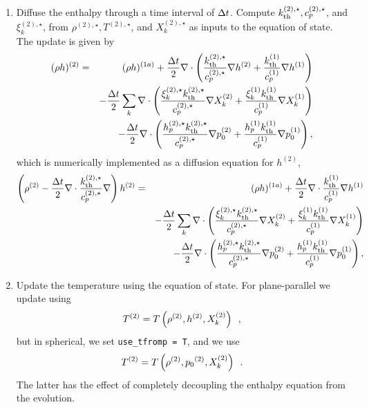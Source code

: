 \begin{description}
\begin{enumerate}
\item Diffuse the enthalpy through a time interval of $\Delta t$.  Compute $k_{\rm th}^{(2),\star}, c_p^{(2),\star}$, and $\xi_k^{(2),\star}$, from $\rho^{(2),\star}, T^{(2),\star}$, and $X_k^{(2),\star}$ as inputs to the equation of state.  The update is given by
\begin{eqnarray}
(\rho h)^{(2)} &=& (\rho h)^{(1a)} + \frac{\Delta t}{2}\nabla\cdot\left(\frac{k_{\rm th}^{(2),\star}}{c_p^{(2),\star}}\nabla h^{(2)} + \frac{k_{\rm th}^{(1)}}{c_p^{(1)}}\nabla h^{(1)}\right)\nonumber\\
&&- \frac{\Delta t}{2}\sum_k\nabla\cdot\left(\frac{\xi_k^{(2),\star}k_{\rm th}^{(2),\star}}{c_p^{(2),\star}}\nabla X_k^{(2)} + \frac{\xi_k^{(1)}k_{\rm th}^{(1)}}{c_p^{(1)}}\nabla X_k^{(1)}\right)\nonumber\\
&&- \frac{\Delta t}{2}\nabla\cdot\left(\frac{h_p^{(2),\star}k_{\rm th}^{(2),\star}}{c_p^{(2),\star}}\nabla p_0^{(2)} + \frac{h_p^{(1)}k_{\rm th}^{(1)}}{c_p^{(1)}}\nabla p_0^{(1)}\right),
\end{eqnarray}
which is numerically implemented as a diffusion equation for $h^{(2)}$,
\begin{eqnarray}
\left(\rho^{(2)} - \frac{\Delta t}{2}\nabla\cdot\frac{k_{\rm th}^{(2),\star}}{c_p^{(2),\star}}\nabla\right)h^{(2)} &=& (\rho h)^{(1a)} + \frac{\Delta t}{2}\nabla\cdot\frac{k_{\rm th}^{(1)}}{c_p^{(1)}}\nabla h^{(1)}\nonumber\\
&&- \frac{\Delta t}{2}\sum_k\nabla\cdot\left(\frac{\xi_k^{(2),\star}k_{\rm th}^{(2),\star}}{c_p^{(2),\star}}\nabla X_k^{(2)} + \frac{\xi_k^{(1)}k_{\rm th}^{(1)}}{c_p^{(1)}}\nabla X_k^{(1)}\right)\nonumber\\
&&- \frac{\Delta t}{2}\nabla\cdot\left(\frac{h_p^{(2),\star}k_{\rm th}^{(2),\star}}{c_p^{(2),\star}}\nabla p_0^{(2)} + \frac{h_p^{(1)}k_{\rm th}^{(1)}}{c_p^{(1)}}\nabla p_0^{(1)}\right),
\end{eqnarray}
\item Update the temperature using the equation of state.  For plane-parallel we
update using
\begin{equation}
T^{(2)} = T\left(\rho^{(2)}, h^{(2)}, X_k^{(2)}\right) \enskip ,
\end{equation}
but in spherical, we set {\tt use\_tfromp = T}, and we use
\begin{equation}
T^{(2)} = T\left(\rho^{(2)}, {p_0}^{(2)}, X_k^{(2)}\right) \enskip .
\end{equation}
The latter has the effect of completely decoupling the enthalpy equation from the 
evolution.


\end{enumerate}
\end{description}
